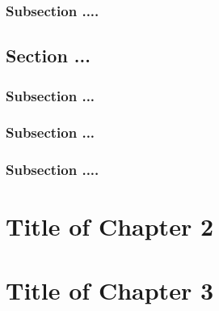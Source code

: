 \documentclass[13pt,a4paper]{extreport}
\begin{document}
\justifying
\subsection{Subsection ....}

\justifying
\section{Section ...}

\justifying
\subsection{Subsection ...}

\justifying
\subsection{Subsection ...}

\justifying
\subsection{Subsection ....}



\justifying
\chapter{Title of Chapter 2}





\justifying
\chapter{Title of Chapter 3}






































































\end{document}
